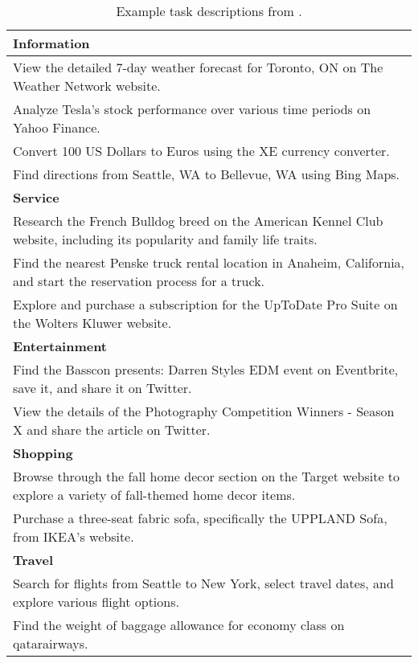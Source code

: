 \begin{table*}
\small
\begin{tabular}{l}
\hline
\cellcolor[gray]{0.9} \textbf{Information} \\
\hline
View the detailed 7-day weather forecast for Toronto, ON on The Weather Network website. \\
Analyze Tesla's stock performance over various time periods on Yahoo Finance. \\
Convert 100 US Dollars to Euros using the XE currency converter. \\
Find directions from Seattle, WA to Bellevue, WA using Bing Maps. \\
\hline
\rowcolor{gray!10}
\textbf{Service} \\
\hline
Research the French Bulldog breed on the American Kennel Club website, including its popularity and family life traits. \\
Find the nearest Penske truck rental location in Anaheim, California, and start the reservation process for a truck. \\
Explore and purchase a subscription for the UpToDate Pro Suite on the Wolters Kluwer website. \\
\hline
\cellcolor[gray]{0.9}\textbf{Entertainment} \\
\hline
Find the Basscon presents: Darren Styles EDM event on Eventbrite, save it, and share it on Twitter. \\
View the details of the Photography Competition Winners - Season X and share the article on Twitter. \\
\hline
\cellcolor[gray]{0.9}\textbf{Shopping} \\
\hline
Browse through the fall home decor section on the Target website to explore a variety of fall-themed home decor items. \\
Purchase a three-seat fabric sofa, specifically the UPPLAND Sofa, from IKEA's website. \\
\hline
\cellcolor[gray]{0.9}\textbf{Travel} \\
\hline
Search for flights from Seattle to New York, select travel dates, and explore various flight options. \\
Find the weight of baggage allowance for economy class on qatarairways. \\
\hline
\end{tabular}
\caption{Example task descriptions from \model.}
\label{tab:traj_ex}
\end{table*}